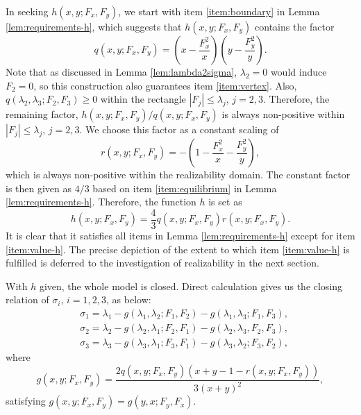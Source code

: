 In seeking $h(x,y; F_x,F_y)$, we start with item \ref{item:boundary}
in Lemma \ref{lem:requirements-h}, which suggests that $h(x,y; F_x,F_y)$
contains the factor
\begin{equation}\label{eq:h-factor}
  q(x,y; F_x,F_y) = \left(x - \dfrac{F_x^2}{x}\right) 
  \left(y - \dfrac{F_y^2}{y}\right).
\end{equation}
Note that as discussed in Lemma \ref{lem:lambda2sigma},
$\lambda_2 = 0$ would induce $F_2 = 0$, so this construction also
guarantees item \ref{item:vertex}. Also,
$q(\lambda_2,\lambda_3; F_2,F_3) \geq 0$ within the rectangle
$|F_j| \leq \lambda_j$, $j = 2,3$. Therefore, the remaining factor,
$ h(x,y; F_x, F_y) / q(x,y; F_x, F_y)$ is always
non-positive within $|F_j| \leq \lambda_j$, $j = 2,3$. We choose this
factor as a constant scaling of
\[
r(x,y;F_x,F_y) = -\left(1-\dfrac{F_x^2}{x} - \dfrac{F_y^2}{y}\right),
\]
which is always non-positive within the realizability domain.  The
constant factor is then given as $4/3$ based on item
\ref{item:equilibrium} in Lemma \ref{lem:requirements-h}. Therefore,
the function $h$ is set as
\begin{equation}\label{eq:h-formula}
  h(x,y;F_x,F_y) = \frac{4}{3} q(x,y;F_x,F_y) r(x,y;F_x,F_y).
\end{equation}
It is clear that it satisfies all items in Lemma
\ref{lem:requirements-h} except for item \ref{item:value-h}. The
precise depiction of the extent to which item \ref{item:value-h} is fulfilled
is deferred to the investigation of realizability in the next section.

With $h$ given, the whole model is closed. Direct
calculation gives us the closing relation of $\sigma_i$, $i = 1,2,3$, as
below:
\begin{equation}\label{eq:sigma-formula}
  \begin{split}
    & \sigma_1 = \lambda_1 - g(\lambda_1,\lambda_2; F_1, F_2)
    - g(\lambda_1,\lambda_3; F_1, F_3), \\
    & \sigma_2 = \lambda_2 - g(\lambda_2, \lambda_1; F_2, F_1)
    - g(\lambda_2,\lambda_3, F_2, F_3), \\
    & \sigma_3 = \lambda_3 - g(\lambda_3, \lambda_1; F_3, F_1)
    - g(\lambda_3, \lambda_2; F_3, F_2),
  \end{split}
\end{equation}
where
\[
g(x,y; F_x, F_y) = \dfrac{2 q(x,y;F_x,F_y) (x + y - 1 -
  r(x,y;F_x,F_y))} {3 (x + y)^2},
\]
satisfying $g(x,y; F_x,F_y) = g(y,x; F_y,F_x)$.

